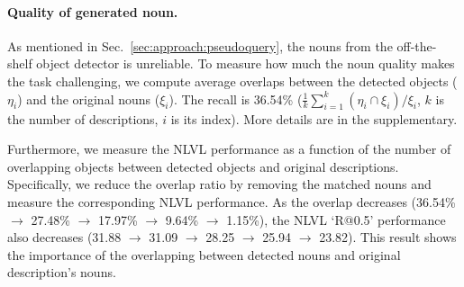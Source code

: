 \vspace{-1em}\paragraph{Quality of generated noun.}
As mentioned in Sec.~\ref{sec:approach:pseudoquery}, the nouns from the off-the-shelf object detector is unreliable. To measure how much the noun quality makes the task challenging, we compute average overlaps between the detected objects ($\eta_i$) and the original nouns ($\xi_i$). The recall is 36.54\% ($\frac{1}{k}\sum_{i=1}^k (\eta_i \cap \xi_i)/\xi_i$, $k$ is the number of descriptions, $i$ is its index).
More details are in the supplementary.

Furthermore, we measure the NLVL performance as a function of the number of overlapping objects between detected objects and original descriptions. 
Specifically, we reduce the overlap ratio by removing the matched nouns and measure the corresponding NLVL performance.
As the overlap decreases (36.54\% $\to$ 27.48\% $\to$ 17.97\% $\to$ 9.64\% $\to$ 1.15\%), the NLVL `R@0.5' performance also decreases (31.88 $\to$ 31.09 $\to$ 28.25 $\to$ 25.94 $\to$ 23.82).
This result shows the importance of the overlapping between detected nouns and original description's nouns.





